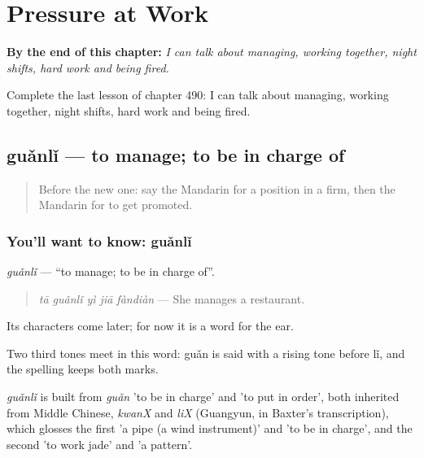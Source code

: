 
\chapter{Pressure at Work}
\label{ch:zh-pressure-at-work}

\begin{chapteropening}
\textbf{By the end of this chapter:} \emph{I can talk about managing, working together, night shifts, hard work and being fired.}

Complete the last lesson of chapter 490: I can talk about managing, working together, night shifts, hard work and being fired.
\end{chapteropening}

\section[guǎnlǐ]{guǎnlǐ — to manage; to be in charge of}

\label{lesson:ZH-C490-guanli}



\begin{quote}
Before the new one: say the Mandarin for a position in a firm, then the Mandarin for to get promoted.
\end{quote}

\subsection*{You'll want to know: guǎnlǐ}
\emph{guǎnlǐ} — \textquotedblleft{}to manage; to be in charge of\textquotedblright{}.

\begin{quote}
\emph{tā guǎnlǐ yì jiā fàndiàn} — She manages a restaurant.
\end{quote}

Its characters come later; for now it is a word for the ear.

Two third tones meet in this word: guǎn is said with a rising tone before lǐ, and the spelling keeps both marks.

\begin{cousinweb}
\emph{guǎnlǐ} is built from \emph{guǎn} 'to be in charge' and  'to put in order', both inherited from Middle Chinese, \emph{kwanX} and \emph{liX} (Guangyun, in Baxter's transcription), which glosses the first 'a pipe (a wind instrument)' and 'to be in charge', and the second 'to work jade' and 'a pattern'.
\end{cousinweb}

